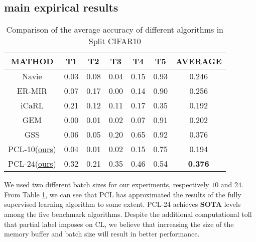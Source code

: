 \documentclass{article} %
\begin{document}
\subsection{main expirical results}
\begin{table}[t]
    \caption{Comparison of the average accuracy of different algorithms in Split CIFAR10}
    \label{table1}
    \begin{center}
        \begin{tabular}{|c|c|c|c|c|c|c|}
        \hline
        \textbf{MATHOD} & \textbf{T1} & \textbf{T2} & \textbf{T3} & \textbf{T4} & \textbf{T5} & \textbf{AVERAGE}\\
        \hline
        Navie & 0.03 & 0.08 & 0.04 & 0.15 & 0.93 & 0.246 \\
        \hline
        ER-MIR & 0.07 & 0.17 & 0.00 & 0.14 & 0.90 & 0.256 \\
        \hline
        iCaRL & 0.21 & 0.12 & 0.11 & 0.17 & 0.35 & 0.192 \\
        \hline
        GEM & 0.00 & 0.01 & 0.02 & 0.07 & 0.91 & 0.202 \\
        \hline
        GSS & 0.06 & 0.05 & 0.20 & 0.65 & 0.92 & 0.376 \\
        \hline
        PCL-10(\underline{ours}) & 0.04 & 0.01 & 0.02 & 0.15 & 0.75 & 0.194 \\
        \hline
        PCL-24(\underline{ours}) & 0.32 & 0.21 & 0.35 & 0.46 & 0.54 & \textbf{0.376} \\
        \hline
        \end{tabular}
    \end{center}
\end{table}
We used two different batch sizes for our experiments, respectively $10$ and $24$. From Table \ref{table1}, we can see that PCL has approximated the results of the fully supervised learning algorithm to some extent. PCL-24 achieves \textbf{SOTA} levels among the five benchmark algorithms. Despite the additional computational toll that partial label imposes on CL, we believe that increasing the size of the memory buffer and batch size will result in better performance. 
\end{document}
